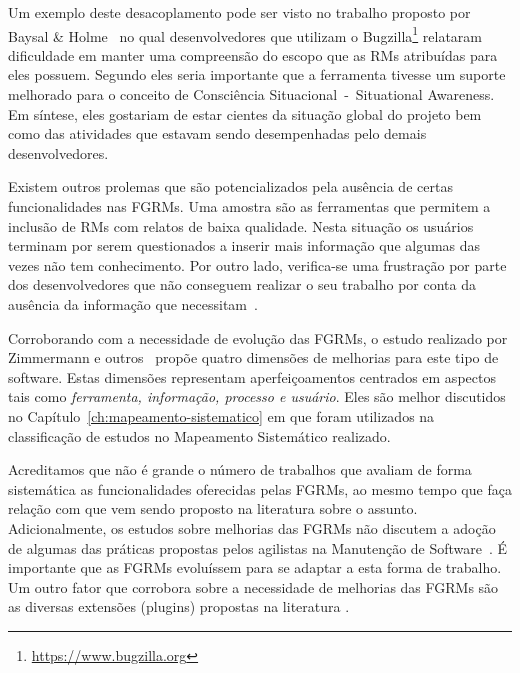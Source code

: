 
Um exemplo deste desacoplamento pode ser visto no trabalho proposto por Baysal
\& Holme~\cite{baysal2012qualitative} no qual desenvolvedores que utilizam o
Bugzilla\footnote{\url{https://www.bugzilla.org}} relataram dificuldade em
manter uma compreensão do escopo que as RMs atribuídas para eles possuem.
Segundo eles seria importante que a ferramenta tivesse um suporte melhorado para
o conceito de Consciência Situacional~-~Situational Awareness. Em síntese, eles
gostariam de estar cientes da situação global do projeto bem como das atividades
que estavam sendo desempenhadas pelo demais desenvolvedores.

Existem outros prolemas que são potencializados pela ausência de certas
funcionalidades nas FGRMs. Uma amostra são as ferramentas que permitem a
inclusão de RMs com relatos de baixa qualidade. Nesta situação os usuários
terminam por serem questionados a inserir mais informação que algumas das vezes
não tem conhecimento. Por outro lado, verifica-se uma frustração por parte dos
desenvolvedores que não conseguem realizar o seu trabalho por conta da ausência
da informação que necessitam~\cite{just2008towards}.

Corroborando com a necessidade de evolução das FGRMs, o estudo realizado por
Zimmermann e outros~\cite{zimmermann2009improving} propõe quatro dimensões de
melhorias para este tipo de software. Estas dimensões representam
aperfeiçoamentos centrados em aspectos tais como \textit{ferramenta, informação,
    processo e usuário}. Eles são melhor discutidos no
Capítulo~\ref{ch:mapeamento-sistematico} em que foram utilizados na
classificação de estudos no Mapeamento Sistemático realizado.


Acreditamos que não é grande o número de trabalhos que avaliam de forma
sistemática as funcionalidades oferecidas pelas FGRMs, ao mesmo tempo que faça
relação com que vem sendo proposto na li\-te\-ra\-tu\-ra sobre o assunto.
Adicionalmente, os estudos sobre melhorias das FGRMs não discutem a adoção de
algumas das práticas propostas pelos agilistas na Manutenção de
Software~\cite{Soltan2016, Heeager2015}. É importante que as FGRMs evoluíssem
para se adaptar a esta forma de trabalho. Um outro fator que corrobora sobre a
necessidade de melhorias das FGRMs são as diversas extensões (plugins) propostas
na literatura
\cite{101186,Thung:2014:BIT:2635868.2661678,Kononenko:2014:DED:2591062.2591075}.

